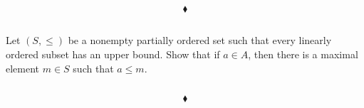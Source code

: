 $$\blacklozenge$$

\renewcommand{\thesubsection}{\thesection.\RomanNumeralCaps{14}}
\subsection{}
\begin{tcolorbox}
Let $(S,\leq )$ be a nonempty partially ordered set such that every linearly ordered subset has an upper bound. Show that if $a\in A$, then there is a maximal element $m\in S$ such that $a\leq m$. 
\end{tcolorbox}
$$ $$

$$\blacklozenge$$
